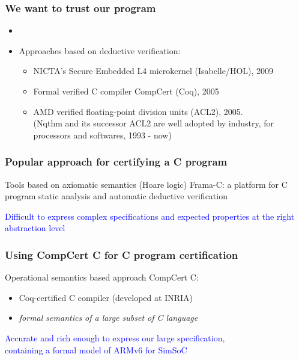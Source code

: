 \documentclass[usenames,dvipsnames]{beamer} %
\begin{document}
\begin{frame}
\frametitle{We want to trust our program}
\begin{block}{}
\begin{itemize}

\item \large{}
\item Approaches based on deductive verification:
  \begin{itemize}
  \item NICTA's Secure Embedded L4 microkernel (Isabelle/HOL), 2009
  \item Formal verified C compiler CompCert (Coq), 2005
  \item AMD verified floating-point division units (ACL2), 2005.\\
    (Nqthm and its successor ACL2 are well adopted by industry, for processors and softwares, 1993 - now)  
  \end{itemize}
\end{itemize}
\end{block}
\end{frame}

\begin{frame}
\frametitle{Popular approach for certifying a C program}
\begin{block}
{Tools based on axiomatic semantics (Hoare logic)}
Frama-C: a platform for C
program static analysis and automatic deductive verification
\end{block}
\bigskip
\textcolor{blue}{%
Difficult to express complex specifications and expected
properties at the right abstraction level
}
\end{frame}

\begin{frame}
\frametitle{Using CompCert C for C program certification}
\begin{block}
{Operational semantics based approach}
CompCert C: 
\begin{itemize}
\item Coq-certified C compiler (developed at INRIA)
\item \textit{formal semantics of a large subset of C language}
\end{itemize}
\end{block}
\bigskip
\textcolor{blue}{%
Accurate and rich enough to express our large specification,\\
containing a formal model of ARMv6 for SimSoC
}
\end{frame}
\end{document}

